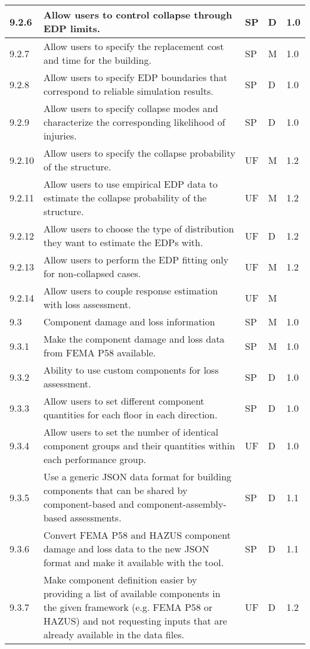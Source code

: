\begin{longtable}{| p{} | p{} | p{} | p{} |  p{} |}
9.2.6 &  Allow users to control collapse through EDP limits. & SP & D & 1.0\\ \hline
9.2.7 &  Allow users to specify the replacement cost and time for the building. & SP & M & 1.0 \\ \hline
9.2.8 &  Allow users to specify EDP boundaries that correspond to reliable simulation results. & SP & D & 1.0\\ \hline
9.2.9 & Allow users to specify collapse modes and characterize the corresponding likelihood of injuries. & SP & D & 1.0\\ \hline
9.2.10 & Allow users to specify the collapse probability of the structure. & UF & M & 1.2\\ \hline
9.2.11 & Allow users to use empirical EDP data to estimate the collapse probability of the structure. & UF & M & 1.2\\ \hline
9.2.12 & Allow users to choose the type of distribution they want to estimate the EDPs with. & UF & D & 1.2\\ \hline
9.2.13 & Allow users to perform the EDP fitting only for non-collapsed cases. & UF & M & 1.2\\ \hline
9.2.14 & Allow users to couple response estimation with loss assessment. & UF & M & \\ \hline
9.3 & Component damage and loss information & SP & M & 1.0\\ \hline
9.3.1 & Make the component damage and loss data from FEMA P58 available. & SP & M & 1.0 \\ \hline
9.3.2 & Ability to use custom components for loss assessment. & SP & D & 1.0 \\ \hline
9.3.3 & Allow users to set different component quantities for each floor in each direction. & SP & D & 1.0 \\ \hline
9.3.4 & Allow users to set the number of identical component groups and their quantities within each performance group. & UF & D & 1.0 \\ \hline
9.3.5 & Use a generic JSON data format for building components that can be shared by component-based and component-assembly-based assessments. & SP & D & 1.1 \\ \hline
9.3.6 & Convert FEMA P58 and HAZUS component damage and loss data to the new JSON format and make it available with the tool. & SP & D & 1.1 \\ \hline
9.3.7 & Make component definition easier by providing a list of available components in the given framework (e.g. FEMA P58 or HAZUS) and not requesting inputs that are already available in the data files. & UF & D & 1.2 \\ \hline

\end{longtable}
